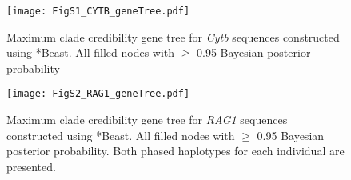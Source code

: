 \documentclass[a4paper]{article}
\begin{document}
\pagestyle{empty}

\begin{figure}[h]
\begin{center}
\texttt{[image: FigS1\_CYTB\_geneTree.pdf]}
\end{center}
\caption{Maximum clade credibility gene tree for \emph{Cytb} sequences constructed using *Beast. %
All filled nodes with $\geq$ 0.95 Bayesian posterior probability}
\end{figure}


\begin{figure}[h]
\begin{center}
\texttt{[image: FigS2\_RAG1\_geneTree.pdf]}
\end{center}
\caption{Maximum clade credibility gene tree for \emph{RAG1} sequences constructed using *Beast. %
All filled nodes with $\geq$ 0.95 Bayesian posterior probability. %
Both phased haplotypes for each individual are presented.}
\end{figure}
%
\end{document}
